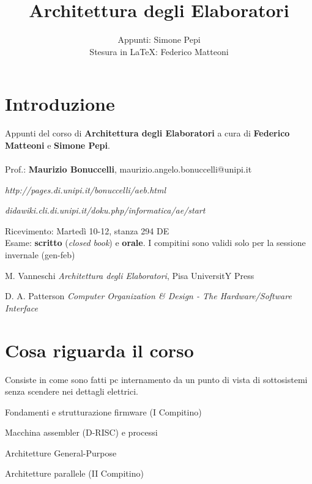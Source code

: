 \documentclass[10pt]{report}
\begin{document}
\title{Architettura degli Elaboratori}
\author{Appunti: Simone Pepi\\Stesura in \LaTeX: Federico Matteoni}
\date{ }
\renewcommand*\contentsname{Indice}

\maketitle
\begin{multicols}{2}
\tableofcontents
\end{multicols}
\pagebreak
\section{Introduzione}
Appunti del corso di \textbf{Architettura degli Elaboratori} a cura di \textbf{Federico Matteoni} e \textbf{Simone Pepi}.\\\\
Prof.: \textbf{Maurizio Bonuccelli}, maurizio.angelo.bonuccelli@unipi.it\\
\begin{list}{-}{Riferimenti web:}
\item \emph{http://pages.di.unipi.it/bonuccelli/aeb.html}
\item \emph{didawiki.cli.di.unipi.it/doku.php/informatica/ae/start}
\end{list}
Ricevimento: Martedì 10-12, stanza 294 DE\\
Esame: \textbf{scritto} (\textit{closed book}) e \textbf{orale}. I compitini sono validi solo per la sessione invernale (gen-feb)\\
\begin{list}{-}{Libri}
\item  M. Vanneschi \textit{Architettura degli Elaboratori}, Pisa UniversitY Press
\item D. A. Patterson \textit{Computer Organization \& Design - The Hardware/Software Interface}
\end{list}
\section{Cosa riguarda il corso}
Consiste in come sono fatti pc internamento da un punto di vista di sottosistemi senza scendere nei dettagli elettrici.
\begin{list}{-}{Il corso è diviso in quattro parti:}
\item Fondamenti e strutturazione firmware (I Compitino)
\item Macchina assembler (D-RISC) e processi
\item Architetture General-Purpose
\item Architetture parallele (II Compitino)
\end{list}
\end{document}
